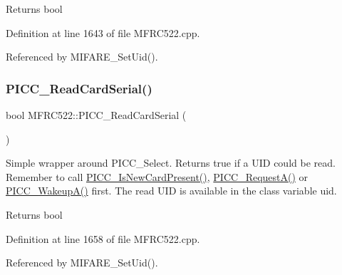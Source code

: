 \begin{DoxyReturn}{Returns}
bool 
\end{DoxyReturn}


Definition at line 1643 of file M\+F\+R\+C522.\+cpp.



Referenced by M\+I\+F\+A\+R\+E\+\_\+\+Set\+Uid().

\mbox{\label{class_m_f_r_c522_aab1218c71cec9cc17ee3ac8a683df106}} 
\subsubsection{\texorpdfstring{P\+I\+C\+C\+\_\+\+Read\+Card\+Serial()}{PICC\_ReadCardSerial()}}
{\footnotesize\ttfamily bool M\+F\+R\+C522\+::\+P\+I\+C\+C\+\_\+\+Read\+Card\+Serial (\begin{DoxyParamCaption}{ }\end{DoxyParamCaption})}

Simple wrapper around P\+I\+C\+C\+\_\+\+Select. Returns true if a U\+ID could be read. Remember to call \hyperlink{class_m_f_r_c522_a3adca9d3b455c680ebcde3b74c4e567b}{P\+I\+C\+C\+\_\+\+Is\+New\+Card\+Present()}, \hyperlink{class_m_f_r_c522_a6db371f6ca95e8ea22445124c79012cc}{P\+I\+C\+C\+\_\+\+Request\+A()} or \hyperlink{class_m_f_r_c522_a009dfa9138c6f999af82d7fc5b17a272}{P\+I\+C\+C\+\_\+\+Wakeup\+A()} first. The read U\+ID is available in the class variable uid.

\begin{DoxyReturn}{Returns}
bool 
\end{DoxyReturn}


Definition at line 1658 of file M\+F\+R\+C522.\+cpp.



Referenced by M\+I\+F\+A\+R\+E\+\_\+\+Set\+Uid().

\mbox{\label{class_m_f_r_c522_a43d475b7d21f31bd1104e81ea5e3d1c9}} 

